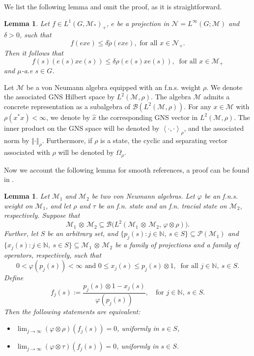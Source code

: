 \documentclass[11pt]{amsart}
\newtheorem{lem}[thm]{Lemma}
\theoremstyle{definition}
\theoremstyle{myremark}
\numberwithin{equation}{section}
\newcommand{\CB}{\mathcal{B}}
\newcommand{\CM}{\mathcal{M}}
\newcommand{\CN}{\mathcal{N}}
\newcommand{\norm}[1]{\left\Vert#1\right\Vert}
\newcommand\inner[2]{\left\langle #1, #2 \right\rangle}
\begin{document}
\noindent We list the following lemma and omit the proof, as it is straightforward. 
\begin{lem}\label{point-eva}
    Let $ f \in L^1(G, \CM_*)_+  $, $ e$ be a projection in $ \CN = L^\infty(G; \CM) $ and $ \delta > 0$, such that 
    $$  f( e x e) \leq \delta \widetilde{\rho}( exe), \text{ for  all } x \in \CN_+. $$
    Then it follows that 
    $$ f(s)(e(s) x e(s) ) \leq \delta \rho( e(s) x e(s) ), ~ \text{ for all } x \in \CM_+$$
    and $\mu$-a.e $s \in G$.
\end{lem}






\noindent 
Let $\CM$ be a von Neumann algebra equipped with an f.n.s. weight $\rho$. We denote the associated GNS Hilbert space by $L^2(\CM, \rho)$. The algebra 
$\CM$ admits a concrete representation as a subalgebra of 
$\CB(L^2(\CM, \rho))$. For any 
$ x \in \CM$ with  $ \rho( x^*x) < \infty $,
we denote by 
$ \hat{x}$ the corresponding GNS vector in 
$L^2(\CM, \rho)$. The inner product on the GNS space will be denoted by 
$\inner{\cdot}{\cdot}_\rho$, and the associated norm by $\norm{\cdot}_\rho$.
\noindent
Furthermore, if 
$\rho$ is a state, the cyclic and separating vector associated with 
$\rho$  will be denoted by 
$\Omega_\rho$. 

Now we account the following lemma for smooth references, a proof can be found in \cite{Bik-Dip-Amenable}.

\begin{lem}\label{uniform conv lem}
Let \( \CM_1 \) and \( \CM_2 \) be two von Neumann algebras. Let \( \varphi \) be an f.n.s. weight on \( \CM_1 \), and let \( \rho \) and \( \tau \) be an f.n. state and an f.n. tracial state on \( \CM_2 \), respectively.
Suppose that
\[
\CM_1 \,\otimes\, \CM_2 \subseteq \mathcal{B}\big(L^2(\CM_1 \,\otimes\, \CM_2,\, \varphi \otimes \rho)\big).
\]
Further, let $S$ be an arbitrary set, and $
\{ p_j{(s)} : j\in \mathbb{N},~ s \in S  \} \subseteq \mathcal{P}(\CM_1)$ and  $
\{ x_j{(s)} : j\in \mathbb{N},~ s \in S \} \subseteq \CM_1 \,\otimes\, \CM_2
$ be a  family  of projections and a 
 family of operators, respectively, such that 
$$ 0< \varphi(p_j(s)) < \infty \text{ and } 0\leq x_j(s) \leq p_j(s) \otimes 1, ~ \text{ for all } j \in \mathbb{N}, ~ s \in S.
$$
Define
\[
f_j(s) := \frac{p_j(s) \otimes 1 - x_j(s)}{\varphi(p_j(s))}, \quad \text{for } j \in \mathbb{N}, ~s\in S.
\]
Then the following statements are equivalent:
\begin{itemize}\setlength\itemsep{.7em}
    \item[(1)] \( \displaystyle \lim_{j \to \infty} (\varphi \otimes \rho)(f_j(s)) = 0 \), uniformly in \( s \in S \),
    \item[(2)] \( \displaystyle \lim_{j \to \infty} (\varphi \otimes \tau)(f_j(s)) = 0 \), uniformly in \( s \in S \).
\end{itemize}
\end{lem}
\end{document}
